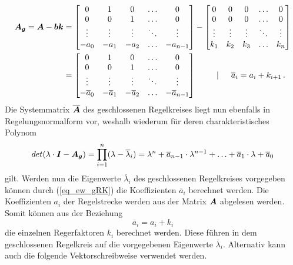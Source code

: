 \begin{equation}
\begin{split}
\boldsymbol{A_g} = \boldsymbol{A}-\boldsymbol{b}\boldsymbol{k} &= \begin{bmatrix}
0 & 1 & 0 & \hdots & 0 \\
0 & 0 & 1 & \hdots & 0 \\
\vdots & \vdots & \vdots & \ddots & \vdots \\
-a_0 & -a_1 & -a_2 & \hdots & -a_{n-1}
\end{bmatrix}
-
\begin{bmatrix}
0 & 0 & 0 & \hdots & 0 \\
0 & 0 & 0 & \hdots & 0 \\
\vdots & \vdots & \vdots &  \ddots & \vdots \\
k_1 & k_2 & k_3 & \hdots & k_n
\end{bmatrix}
\\
&= \begin{bmatrix}
0 & 1 & 0 & \hdots & 0 \\
0 & 0 & 1 & \hdots & 0 \\
\vdots & \vdots & \vdots & \ddots & \vdots \\
-\overline{a}_0 & -\overline{a}_1 & -\overline{a}_2 & \hdots & -\overline{a}_{n-1}
\end{bmatrix}
\hspace{25pt} \vert \hspace{15pt} \overline{a}_i = a_i + k_{i+1} \,.
\end{split}
\end{equation}
Die Systemmatrix $\boldsymbol{\overline{A}}$ des geschlossenen Regelkreises liegt nun ebenfalls in Regelungsnormalform vor, weshalb wiederum für deren charakteristisches Polynom
\begin{equation}
det(\lambda\cdot \boldsymbol{I}-\boldsymbol{A_g}) = \prod^n_{i=1} (\lambda-\overline{\lambda}_i) = \lambda^n+\overline{a}_{n-1}\cdot \lambda^{n-1} + \hdots + \overline{a}_1\cdot \lambda + \overline{a}_0
\label{eq_ew_gRK}
\end{equation}
gilt. Werden nun die Eigenwerte $\overline{\lambda}_i$ des geschlossenen Regelkreises vorgegeben können durch (\ref{eq_ew_gRK}) die Koeffizienten $\overline{a}_i$ berechnet werden. Die Koeffizienten $a_i$ der Regelstrecke werden aus der Matrix $\boldsymbol{A}$ abgelesen werden. Somit können aus der Beziehung
\begin{equation}
\overline{a}_i = a_i + k_i
\end{equation}
die einzelnen Regerfaktoren $k_i$ berechnet werden. Diese führen in dem geschlossenen Regelkreis auf die vorgegebenen Eigenwerte $\overline{\lambda}_i$. Alternativ kann auch die folgende Vektorschreibweise verwendet werden.

